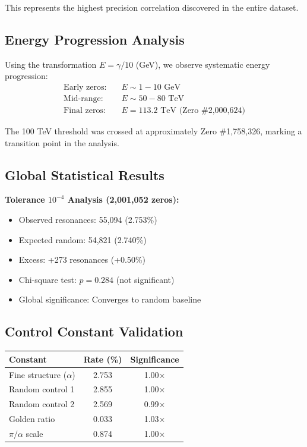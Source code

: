 \documentclass[12pt, a4paper]{article}
\begin{document}
This represents the highest precision correlation discovered in the entire dataset.

\subsection{Energy Progression Analysis}
Using the transformation $E = \gamma/10$ (GeV), we observe systematic energy progression:
\begin{align}
\text{Early zeros:} \quad &E \sim 1-10 \text{ GeV} \\
\text{Mid-range:} \quad &E \sim 50-80 \text{ TeV} \\
\text{Final zeros:} \quad &E = 113.2 \text{ TeV (Zero \#2,000,624)}
\end{align}

The 100 TeV threshold was crossed at approximately Zero \#1,758,326, marking a transition point in the analysis.

\subsection{Global Statistical Results}
\textbf{Tolerance $10^{-4}$ Analysis (2,001,052 zeros):}
\begin{itemize}
    \item Observed resonances: 55,094 (2.753\%)
    \item Expected random: 54,821 (2.740\%)
    \item Excess: +273 resonances (+0.50\%)
    \item Chi-square test: $p = 0.284$ (not significant)
    \item Global significance: Converges to random baseline
\end{itemize}

\subsection{Control Constant Validation}
\begin{table}[h]
\centering
\begin{tabular}{lcc}
\textbf{Constant} & \textbf{Rate (\%)} & \textbf{Significance} \\
\hline
Fine structure ($\alpha$) & 2.753 & 1.00× \\
Random control 1 & 2.855 & 1.00× \\
Random control 2 & 2.569 & 0.99× \\
Golden ratio & 0.033 & 1.03× \\
$\pi/\alpha$ scale & 0.874 & 1.00× \\
\end{tabular}
\end{table}
\end{document}
